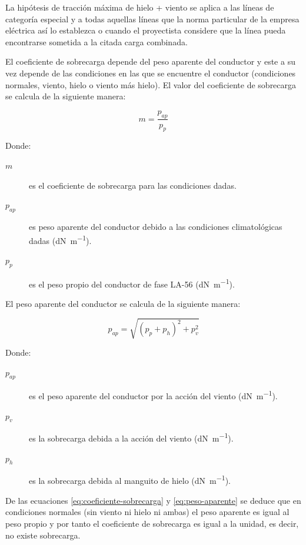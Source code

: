 \begin{table}[H]
\begin{tabular}{|cccc|}
\end{tabular}
\end{table}

La hipótesis de tracción máxima de hielo + viento se aplica a las líneas de categoría especial y a todas aquellas líneas que la norma particular de la empresa eléctrica así lo establezca o cuando el proyectista considere que la línea pueda encontrarse sometida a la citada carga combinada. 

El coeficiente de sobrecarga depende del peso aparente del conductor y este a su vez depende de las condiciones en las que se encuentre el conductor (condiciones normales, viento, hielo o viento más hielo). El valor del coeficiente de sobrecarga se calcula de la siguiente manera:

\begin{equation}
    m = \frac{p_{ap}}{p_p}
    \label{eq:coeficiente-sobrecarga}
\end{equation}

Donde:
\begin{description}
  \item[$m$] es el coeficiente de sobrecarga para las condiciones dadas.
  \item[$p_{ap}$] es peso aparente del conductor debido a las condiciones climatológicas dadas (\si{\deca\newton\per\meter}).
  \item[$p_p$] es el peso propio del conductor de fase LA-56 (\si{\deca\newton\per\meter}).
\end{description}

El peso aparente del conductor se calcula de la siguiente manera:

\begin{equation}
    p_{ap} = \sqrt{(p_p + p_h)^2 + p_v^2}
    \label{eq:peso-aparente}
\end{equation}

Donde:
\begin{description}
  \item[$p_{ap}$] es el peso aparente del conductor por la acción del viento (\si{\deca\newton\per\meter}).
  \item[$p_v$] es la sobrecarga debida a la acción del viento (\si{\deca\newton\per\meter}).
  \item[$p_h$] es la sobrecarga debida al manguito de hielo (\si{\deca\newton\per\meter}).
\end{description}

De las ecuaciones \eqref{eq:coeficiente-sobrecarga} y \eqref{eq:peso-aparente} se deduce que en condiciones normales (sin viento ni hielo ni ambas) el peso aparente es igual al peso propio y por tanto el coeficiente de sobrecarga es igual a la unidad, es decir, no existe sobrecarga.

